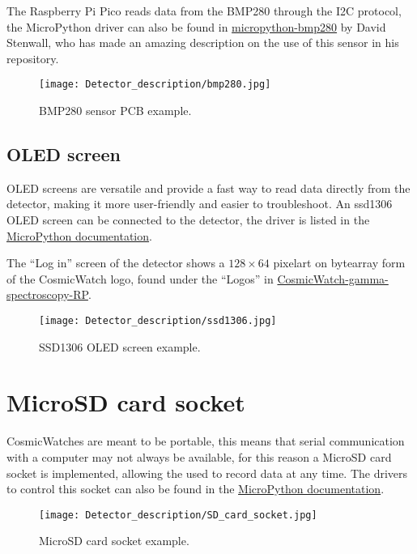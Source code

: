 The Raspberry Pi Pico reads data from the BMP280 through the I2C protocol, the MicroPython driver can also be found in \href{https://github.com/dafvid/micropython-bmp280}{micropython-bmp280} by David Stenwall, who has made an amazing description on the use of this sensor in his repository.

\begin{figure}[H]
  \centering
  \texttt{[image: Detector\_description/bmp280.jpg]}
  \caption{BMP280 sensor PCB example.}
  \label{fig:bmp280}
\end{figure}

\subsection{OLED screen}

OLED screens are versatile and provide a fast way to read data directly from the detector, making it more user-friendly and easier to troubleshoot. An ssd1306 OLED screen can be connected to the detector, the driver is listed in the \href{https://github.com/micropython/micropython-lib/tree/master/micropython/drivers/display}{MicroPython documentation}.

The ``Log in'' screen of the detector shows a $128\times 64$ pixelart on bytearray form of the CosmicWatch logo, found under the ``Logos'' in \href{https://github.com/anvargasl/CosmicWatch-gamma-spectroscopy-RP}{CosmicWatch-gamma-spectroscopy-RP}.

\begin{figure}[H]
  \centering
  \texttt{[image: Detector\_description/ssd1306.jpg]}
  \caption{SSD1306 OLED screen example.}
  \label{fig:ssd1306}
\end{figure}

\section{MicroSD card socket}

CosmicWatches are meant to be portable, this means that serial communication with a computer may not always be available, for this reason a MicroSD card socket is implemented, allowing the used to record data at any time. The drivers to control this socket can also be found in the \href{https://github.com/micropython/micropython-lib/tree/master/micropython/drivers/storage/sdcard}{MicroPython documentation}.

\begin{figure}[H]
  \centering
  \texttt{[image: Detector\_description/SD\_card\_socket.jpg]}
  \caption{MicroSD card socket example.}
  \label{fig:sd_card}
\end{figure}

